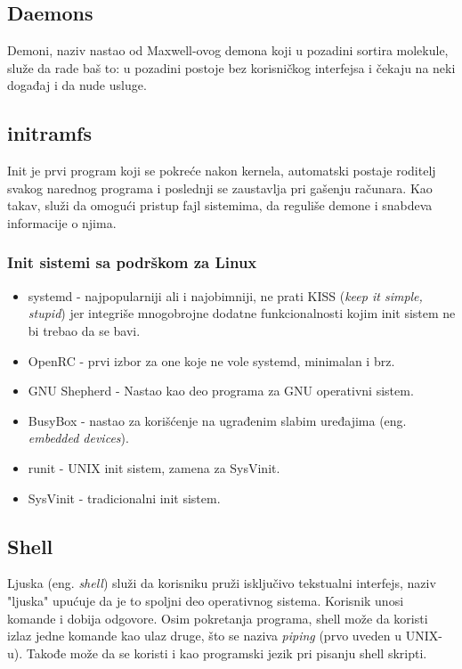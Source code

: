\documentclass[a4paper,14pt]{article}
\begin{document}
\subsection{Daemons}
Demoni\cite{daemon}, naziv nastao od Maxwell-ovog demona koji u pozadini sortira molekule, služe da rade baš to: u pozadini postoje bez korisničkog interfejsa i čekaju na neki događaj i da nude usluge.

\subsection{initramfs}
Init je prvi program koji se pokreće nakon kernela, automatski postaje roditelj svakog narednog programa i poslednji se zaustavlja pri gašenju računara. Kao takav, služi da omogući pristup fajl sistemima, da reguliše demone i snabdeva informacije o njima.
\subsubsection{Init sistemi sa podrškom za Linux}
\begin{itemize}
\item systemd - najpopularniji ali i najobimniji, ne prati KISS (\textit{keep it simple, stupid}) jer integriše mnogobrojne dodatne funkcionalnosti kojim init sistem ne bi trebao da se bavi.
\item OpenRC - prvi izbor za one koje ne vole systemd, minimalan i brz.
\item GNU Shepherd - Nastao kao deo programa za GNU operativni sistem.
\item BusyBox - nastao za korišćenje na ugrađenim slabim uređajima (eng. \textit{embedded devices}).
\item runit - UNIX init sistem, zamena za SysVinit.
\item SysVinit - tradicionalni init sistem.
\end{itemize}
\newpage

\subsection{Shell}
Ljuska (eng. \textit{shell}) služi da korisniku pruži isključivo tekstualni interfejs, naziv "ljuska" upućuje da je to spoljni deo operativnog sistema. Korisnik unosi komande i dobija odgovore. Osim pokretanja programa, shell može da koristi izlaz jedne komande kao ulaz druge, što se naziva \textit{piping} (prvo uveden u UNIX-u). Takođe može da se koristi i kao programski jezik pri pisanju shell skripti.
\end{document}
